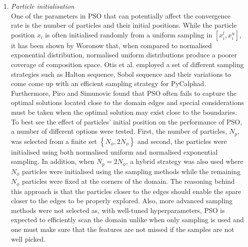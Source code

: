 \begin{enumerate}
		\item \emph{Particle initialisation}\\
			One of the parameters in PSO that can potentially affect the convergence rate is the number of particles and their initial positions. While the particle position $x_i$ is often initialised randomly from a uniform sampling in $\left[ x_i^l, x_i^u\right]$, it has been shown by Woronow \cite{Woronow:1993aa} that, when compared to normalised exponential distribution, normalised uniform distributions produce a poorer coverage of composition space. Otis et al. \cite{Otis:2017ab} employed a set of different sampling strategies such as Halton sequence, Sobol sequence and their variations to come come up with an efficient sampling strategy for PyCalphad. Furthermore, Piro and Simunovic \cite{Piro16} found that PSO often fails to capture the optimal solutions located close to the domain edges and special considerations must be taken when the optimal solution may exist close to the boundaries. To best see the effect of particles' initial position on the performance of PSO, a number of different options were tested. First, the number of particles, $N_p$, was selected from a finite set $\left\{ N_\phi, 2N_\phi\right\}$ and second, the particles were initialised using both normalised uniform and normalised exponential sampling. In addition, when $N_p = 2N_\phi$, a hybrid strategy was also used where $N_\phi$ particles were initialised using the sampling methods while the remaining $N_\phi$ particles were fixed at the corners of the domain. The reasoning behind this approach is that the particles closer to the edges should enable the spare closer to the edges to be properly explored. Also, more advanced sampling methods were not selected as, with well-tuned hyperparameters, PSO is expected to efficiently scan the domain unlike when only sampling is used and one must make sure that the features are not missed if the samples are not well picked. 


\end{enumerate}
